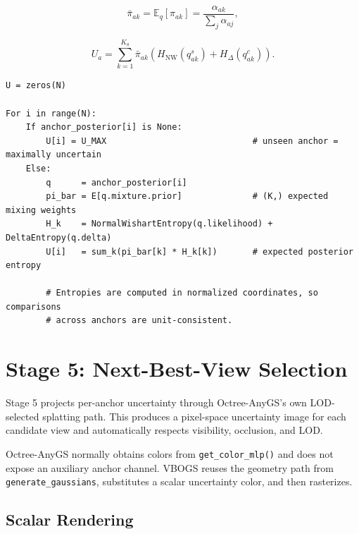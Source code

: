 \documentclass[11pt]{article}
\newcommand{\E}{\mathbb{E}}
\begin{document}
\[
  \bar{\pi}_{ak}
  =
  \E_q[\pi_{ak}]
  =
  \frac{\alpha_{ak}}{\sum_j \alpha_{aj}},
\]

\[
  U_a
  =
  \sum_{k=1}^{K_a}
  \bar{\pi}_{ak}
  \left(
    H_{\mathrm{NW}}(q^s_{ak})
    +
    H_{\Delta}(q^c_{ak})
  \right).
\]

\begin{lstlisting}
U = zeros(N)

For i in range(N):
    If anchor_posterior[i] is None:
        U[i] = U_MAX                             # unseen anchor = maximally uncertain
    Else:
        q      = anchor_posterior[i]
        pi_bar = E[q.mixture.prior]              # (K,) expected mixing weights
        H_k    = NormalWishartEntropy(q.likelihood) + DeltaEntropy(q.delta)
        U[i]   = sum_k(pi_bar[k] * H_k[k])       # expected posterior entropy

        # Entropies are computed in normalized coordinates, so comparisons
        # across anchors are unit-consistent.
\end{lstlisting}

\section{Stage 5: Next-Best-View Selection}

Stage 5 projects per-anchor uncertainty through Octree-AnyGS's own
LOD-selected splatting path. This produces a pixel-space uncertainty image for
each candidate view and automatically respects visibility, occlusion, and LOD.

Octree-AnyGS normally obtains colors from \texttt{get\_color\_mlp()} and does
not expose an auxiliary anchor channel. VBOGS reuses the geometry path from
\texttt{generate\_gaussians}, substitutes a scalar uncertainty color, and then
rasterizes.

\subsection{Scalar Rendering}
\end{document}
